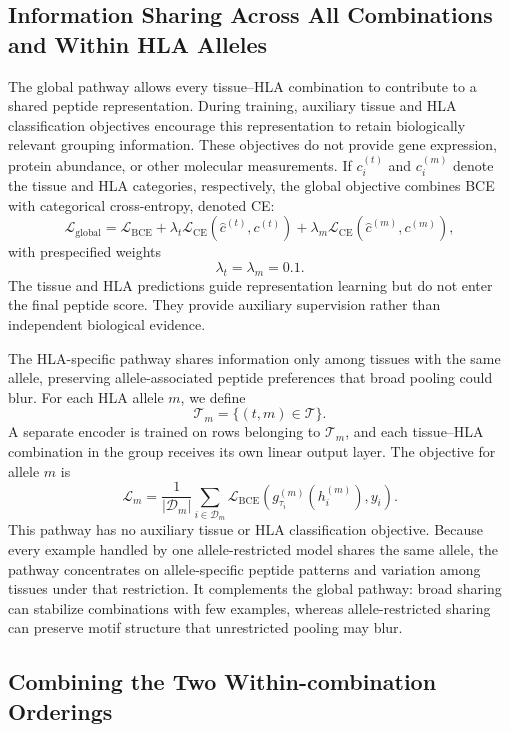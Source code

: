 \subsection{Information Sharing Across All Combinations and Within HLA Alleles}

The global pathway allows every tissue--HLA combination to contribute to a shared peptide representation. During training, auxiliary tissue and HLA classification objectives encourage this representation to retain biologically relevant grouping information. These objectives do not provide gene expression, protein abundance, or other molecular measurements. If \(c_i^{(t)}\) and \(c_i^{(m)}\) denote the tissue and HLA categories, respectively, the global objective combines BCE with categorical cross-entropy, denoted CE:
\[
\mathcal{L}_{\mathrm{global}}
=
\mathcal{L}_{\mathrm{BCE}}
+
\lambda_t
\mathcal{L}_{\mathrm{CE}}
\left(
\widehat{c}^{(t)},c^{(t)}
\right)
+
\lambda_m
\mathcal{L}_{\mathrm{CE}}
\left(
\widehat{c}^{(m)},c^{(m)}
\right),
\]
with prespecified weights
\[
\lambda_t=\lambda_m=0.1.
\]
The tissue and HLA predictions guide representation learning but do not enter the final peptide score. They provide auxiliary supervision rather than independent biological evidence.

The HLA-specific pathway shares information only among tissues with the same allele, preserving allele-associated peptide preferences that broad pooling could blur. For each HLA allele \(m\), we define
\[
\mathcal{T}_m
=
\{(t,m)\in\mathcal{T}\}.
\]
A separate encoder is trained on rows belonging to \(\mathcal{T}_m\), and each tissue--HLA combination in the group receives its own linear output layer. The objective for allele \(m\) is
\[
\mathcal{L}_{m}
=
\frac{1}{|\mathcal{D}_m|}
\sum_{i\in\mathcal{D}_m}
\mathcal{L}_{\mathrm{BCE}}
\left(
g^{(m)}_{\tau_i}(h_i^{(m)}),y_i
\right).
\]
This pathway has no auxiliary tissue or HLA classification objective. Because every example handled by one allele-restricted model shares the same allele, the pathway concentrates on allele-specific peptide patterns and variation among tissues under that restriction. It complements the global pathway: broad sharing can stabilize combinations with few examples, whereas allele-restricted sharing can preserve motif structure that unrestricted pooling may blur.

\subsection{Combining the Two Within-combination Orderings}


